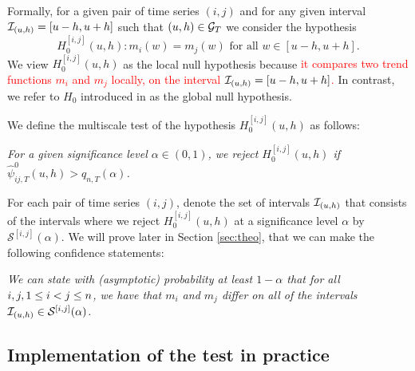 \documentclass[a4paper,12pt]{article}
\makeatletter
\renewcommand{\eqref}[1]{\tagform@{\ref{#1}}}
\makeatother
\begin{document}
Formally, for a given pair of time series $(i, j)$ and for any given interval \linebreak $\mathcal{I}_{(u, h)} = [u-h, u+h]$ such that $(u, h) \in \mathcal{G}_T$ we consider the hypothesis 
\[ H_0^{[i,j]}(u,h): m_i(w) = m_j(w) \text{ for all } w \in [u-h,u+h]. \] 
We view $H_0^{[i,j]}(u,h)$ as the local null hypothesis because \textcolor{red}{it compares two trend functions $m_i$ and $m_j$ locally, on the interval $\mathcal{I}_{(u, h)} = [u-h, u+h]$.} In contrast, we refer to $H_0$ introduced in \eqref{eq:null} as the global null hypothesis.

We define the multiscale test of the hypothesis $H_0^{[i,j]}(u,h)$ as follows: 
\begin{center}
\begin{minipage}[c][1.25cm][c]{13cm}
\textit{For a given significance level $\alpha \in (0,1)$, we reject $H_0^{[i,j]}(u,h)$ if \linebreak $\hat{\psi}^0_{ij,T}(u, h) > q_{n,T}(\alpha)$.}
\end{minipage}
\end{center}

For each pair of time series $(i, j)$, denote the set of intervals $\mathcal{I}_{(u, h)}$ that consists of the intervals where we reject $H_0^{[i,j]}(u,h)$ at a significance level $\alpha$ by $\mathcal{S}^{[i, j]}(\alpha)$. We will prove later in Section \ref{sec:theo}, that we can make the following confidence statements:

\begin{center}
\begin{minipage}[c][1.45cm][c]{13cm}
\textit{We can state with (asymptotic) probability at least $1-\alpha$ that for all $i, j, \linebreak1\leq i < j \leq n$, we have that $m_i$ and $m_j$ differ on all of the intervals $\mathcal{I}_{(u, h)} \in \mathcal{S}^{[i, j]}(\alpha)$.}
\end{minipage}
\end{center}


\subsection{Implementation of the test in practice}\label{subsec:test:impl}
\end{document}
